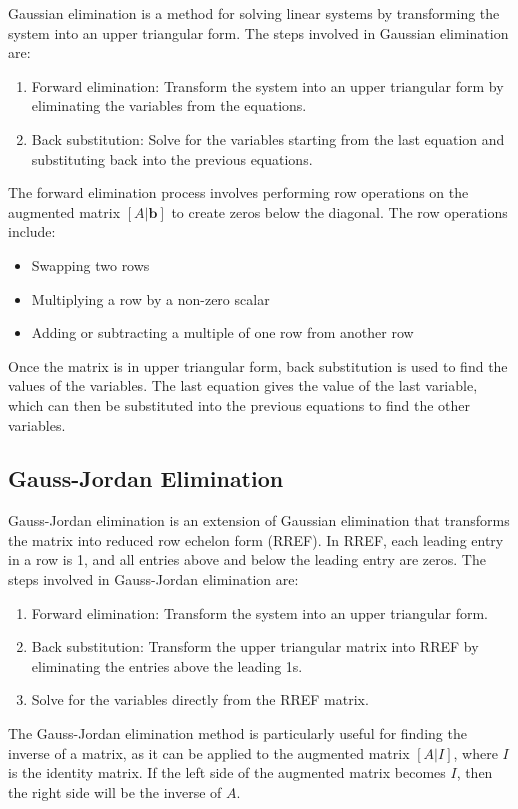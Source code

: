 Gaussian elimination is a method for solving linear systems by transforming the system into an upper triangular form. The steps involved in Gaussian elimination are:
\begin{enumerate}
	\item Forward elimination: Transform the system into an upper triangular form by eliminating the variables from the equations.
	\item Back substitution: Solve for the variables starting from the last equation and substituting back into the previous equations.
\end{enumerate}
The forward elimination process involves performing row operations on the augmented matrix \([A | \mathbf{b}]\) to create zeros below the diagonal. The row operations include:
\begin{itemize}[label=\(-\)]
	\item Swapping two rows
	\item Multiplying a row by a non-zero scalar
	\item Adding or subtracting a multiple of one row from another row
\end{itemize}
Once the matrix is in upper triangular form, back substitution is used to find the values of the variables. The last equation gives the value of the last variable, which can then be substituted into the previous equations to find the other variables.

\subsection{Gauss-Jordan Elimination}

Gauss-Jordan elimination is an extension of Gaussian elimination that transforms the matrix into reduced row echelon form (RREF). In RREF, each leading entry in a row is 1, and all entries above and below the leading entry are zeros. The steps involved in Gauss-Jordan elimination are:
\begin{enumerate}
	\item Forward elimination: Transform the system into an upper triangular form.
	\item Back substitution: Transform the upper triangular matrix into RREF by eliminating the entries above the leading 1s.
	\item Solve for the variables directly from the RREF matrix.
\end{enumerate}
The Gauss-Jordan elimination method is particularly useful for finding the inverse of a matrix, as it can be applied to the augmented matrix \([A | I]\), where \(I\) is the identity matrix. If the left side of the augmented matrix becomes \(I\), then the right side will be the inverse of \(A\).

